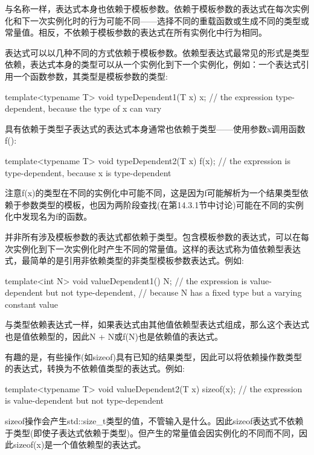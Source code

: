与名称一样，表达式本身也依赖于模板参数。依赖于模板参数的表达式在每次实例化和下一次实例化时的行为可能不同——选择不同的重载函数或生成不同的类型或常量值。相反，不依赖于模板参数的表达式在所有实例化中行为相同。

表达式可以以几种不同的方式依赖于模板参数。依赖型表达式最常见的形式是类型依赖，表达式本身的类型可以从一个实例化到下一个实例化，例如：一个表达式引用一个函数参数，其类型是模板参数的类型:

\begin{cpp}
template<typename T> void typeDependent1(T x)
{
	x; // the expression type-dependent, because the type of x can vary
}
\end{cpp}

具有依赖于类型子表达式的表达式本身通常也依赖于类型——使用参数x调用函数f():

\begin{cpp}
template<typename T> void typeDependent2(T x)
{
	f(x); // the expression is type-dependent, because x is type-dependent
}
\end{cpp}

注意f(x)的类型在不同的实例化中可能不同，这是因为f可能解析为一个结果类型依赖于参数类型的模板，也因为两阶段查找(在第14.3.1节中讨论)可能在不同的实例化中发现名为f的函数。

并非所有涉及模板参数的表达式都依赖于类型。包含模板参数的表达式，可以在每次实例化到下一次实例化时产生不同的常量值。这样的表达式称为值依赖型表达式，最简单的是引用非依赖类型的非类型模板参数表达式。例如:

\begin{cpp}
template<int N> void valueDependent1()
{
	N; // the expression is value-dependent but not type-dependent,
	// because N has a fixed type but a varying constant value
}
\end{cpp}

与类型依赖表达式一样，如果表达式由其他值依赖型表达式组成，那么这个表达式也是值依赖型的，因此N + N或f(N)也是依赖值的表达式。

有趣的是，有些操作(如sizeof)具有已知的结果类型，因此可以将依赖操作数类型的表达式，转换为不依赖值类型的表达式。例如:

\begin{cpp}
template<typename T> void valueDependent2(T x)
{
	sizeof(x); // the expression is value-dependent but not type-dependent
}
\end{cpp}

sizeof操作会产生std::size\_t类型的值，不管输入是什么。因此sizeof表达式不依赖于类型(即使子表达式依赖于类型)。但产生的常量值会因实例化的不同而不同，因此sizeof(x)是一个值依赖型的表达式。

